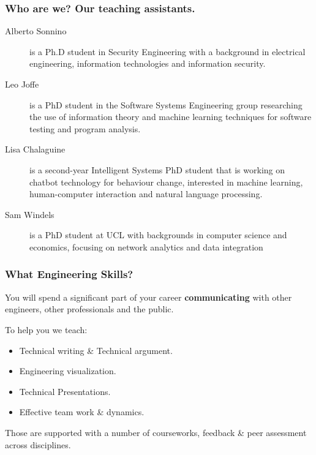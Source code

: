 \documentclass{beamer} %
\newcommand\emc[1]{\textcolor{brightblue}{\textbf{#1}}}
\begin{document}
\begin{frame}
\frametitle{Who are we? Our teaching assistants.} 

\begin{description}
\item[Alberto Sonnino] is a Ph.D student in Security Engineering with a background in electrical engineering, information technologies and information security.
\item[Leo Joffe] is a PhD student in the Software Systems Engineering group researching the use of information theory and machine learning techniques for software testing and program analysis.
\item[Lisa Chalaguine] is a second-year Intelligent Systems PhD student that is working on chatbot technology for behaviour change, interested in machine learning, human-computer interaction and natural language processing. 
\item[Sam Windels] is a PhD student at UCL with backgrounds in computer science and economics, focusing on network analytics and data integration 
\end{description}

\end{frame}


\begin{frame}
\frametitle{What Engineering Skills?} 

You will spend a significant part of your career \emc{communicating} with other engineers, other professionals and the public.

\vspace{3mm}
To help you we teach:
\begin{itemize}
\item Technical writing \& Technical argument.
\item Engineering visualization.
\item Technical Presentations.
\item Effective team work \& dynamics.
\end{itemize}

\vspace{3mm}
Those are supported with a number of courseworks, feedback \& peer assessment across disciplines.

\end{frame}
\end{document}
